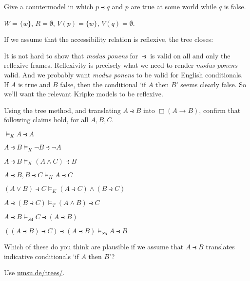\begin{exercise}
  Give a countermodel in which $p \strictif q$ and $p$ are true at some world
  while $q$ is false.
\end{exercise}
\begin{solution}
  $W = \{ w \}$, $R = \emptyset$, $V(p) = \{ w \} $, $V(q)=\emptyset$.
\end{solution}

If we assume that the accessibility relation is reflexive, the tree closes:
\begin{center}
\end{center}

It is not hard to show that \emph{modus ponens} for $\strictif$ is valid on all
and only the reflexive frames. Reflexivity is precisely what we need to render
\emph{modus ponens} valid. And we probably want \emph{modus ponens} to be valid
for English conditionals. If $A$ is true and $B$ false, then the conditional `if
$A$ then $B$' seems clearly false. So we'll want the relevant Kripke models to
be reflexive.

\begin{exercise}\label{ex:sda-import}
  Using the tree method, and translating $A \strictif B$ into $\Box(A \to B)$, confirm that following claims hold, for all $A,B,C$.
  \begin{exlist}
  \item $\models_K A \strictif A$
  \item $A \strictif B \models_K \neg B \strictif \neg A$
  \item $A \strictif B \models_K (A \land C) \strictif B$
  \item $A\strictif B, B \strictif C \models_{K} A \strictif C$
  \item $(A \lor B) \strictif C \models_K (A \strictif C) \land (B \strictif C)$
  \item $A \strictif (B \strictif C) \models_T (A \land B) \strictif C$
  \item $A\strictif B \models_{S4} C \strictif (A \strictif B)$
  \item $((A\strictif B) \strictif C) \strictif (A\strictif B) \models_{S5} A\strictif B$
  \end{exlist}
  Which of these do you think are plausible if we
  assume that $A \strictif B$ translates indicative conditionals `if $A$ then $B$'?
\end{exercise}
\begin{solution}
  Use \href{https://www.umsu.de/trees/}{umsu.de/trees/}.
\end{solution}

